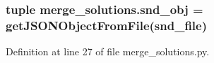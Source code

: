 \hypertarget{namespacemerge__solutions_a5b10d08f2e1f7a3c0660a4350142c13d}{}
\subsubsection[{snd\+\_\+obj}]{\setlength{\rightskip}{0pt plus 5cm}tuple merge\+\_\+solutions.\+snd\+\_\+obj = {\bf get\+J\+S\+O\+N\+Object\+From\+File}(snd\+\_\+file)}\label{namespacemerge__solutions_a5b10d08f2e1f7a3c0660a4350142c13d}


Definition at line 27 of file merge\+\_\+solutions.\+py.

